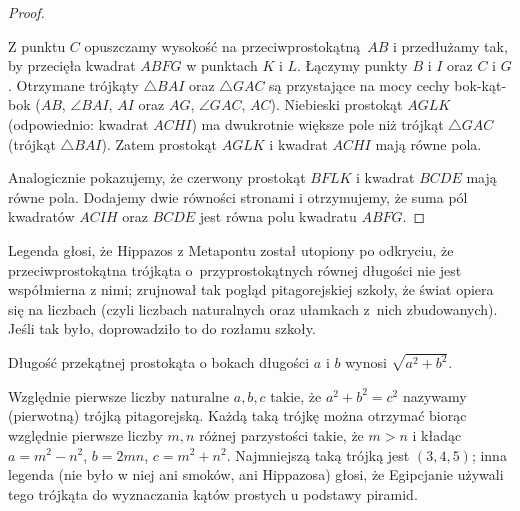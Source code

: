 \begin{proof}
\begin{center}
\begin{comment}
        \tkzDefSquare(C,B)
        \tkzGetPoints{E}{D}
        \tkzDrawPolygon[line width=0.3mm,fill=red!40](C,B,E,D)
        \tkzLabelPoint[above](D){$D$}
        \tkzLabelPoint[below](E){$E$}
        \tkzDefSquare(A,C)
        \tkzGetPoints{H}{I}
        \tkzDrawPolygon[line width=0.3mm, fill=blue!40](A,C,H,I)
        \tkzLabelPoint[above right](H){$H$}
        \tkzLabelPoint[above right](I){$I$}
        \tkzDrawSegments[line width=0.2mm](C,G)
        \tkzDrawSegments[line width=0.2mm, dashed](C,K)
        \tkzDrawSegments[line width=0.2mm](I,B)
        \tkzDrawPolygon[line width=0.5mm](A,B,C)
    \end{tikzpicture}
\end{comment}
    \end{center}
    Z punktu $C$ opuszczamy wysokość na przeciwprostokątną $AB$ i przedłużamy tak, by przecięła kwadrat $ABFG$ w punktach $K$ i $L$.
    Łączymy punkty $B$ i $I$ oraz $C$ i $G$.
    Otrzymane trójkąty $\triangle BAI$ oraz $\triangle GAC$ są przystające na mocy cechy bok-kąt-bok ($AB$, $\angle BAI$, $AI$ oraz $AG$, $\angle GAC$, $AC$).
    Niebieski prostokąt $AGLK$ (odpowiednio: kwadrat $ACHI$) ma dwukrotnie większe pole niż trójkąt $\triangle GAC$ (trójkąt $\triangle BAI$).
    Zatem prostokąt $AGLK$ i kwadrat $ACHI$ mają równe pola.
    
    Analogicznie pokazujemy, że czerwony prostokąt $BFLK$ i kwadrat $BCDE$ mają równe pola.
    Dodajemy dwie równości stronami i otrzymujemy, że suma pól kwadratów $ACIH$ oraz $BCDE$ jest równa polu kwadratu $ABFG$.
\end{proof}

Legenda głosi, że Hippazos z Metapontu został utopiony po odkryciu, że przeciwprostokątna trójkąta o~przyprostokątnych równej długości nie jest współmierna z nimi; zrujnował tak pogląd pitagorejskiej szkoły, że świat opiera się na liczbach (czyli liczbach naturalnych oraz ułamkach z~nich zbudowanych).
%
%
Jeśli tak było, doprowadziło to do rozłamu szkoły.

\begin{corollary}
    Długość przekątnej prostokąta o bokach długości $a$ i $b$ wynosi $\sqrt{a^2 + b^2}$.
\end{corollary}

Względnie pierwsze liczby naturalne $a, b, c$ takie, że $a^2 + b^2 = c^2$ nazywamy (pierwotną) trójką pitagorejską.
%
Każdą taką trójkę można otrzymać biorąc względnie pierwsze liczby $m, n$ różnej parzystości takie, że $m > n$ i kładąc $a = m^2 - n^2$, $b = 2 mn$, $c = m^2 + n^2$.
Najmniejszą taką trójką jest $(3, 4, 5)$; inna legenda (nie było w niej ani smoków, ani Hippazosa) głosi, że Egipcjanie używali tego trójkąta do wyznaczania kątów prostych u podstawy piramid.

